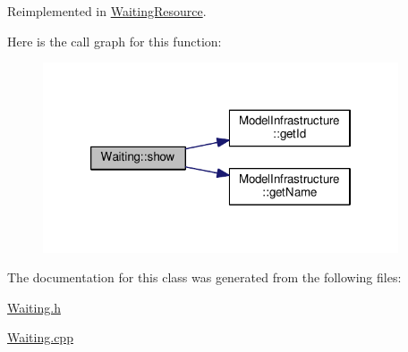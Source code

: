 Reimplemented in \hyperlink{class_waiting_resource_afb0323a90d99b50d66de7f38d069b122}{Waiting\-Resource}.



Here is the call graph for this function\-:
\nopagebreak
\begin{figure}[H]
\begin{center}
\leavevmode
\includegraphics[width=298pt]{class_waiting_aa8b8a3e589f580e3e066a0f9423f4c76_cgraph}
\end{center}
\end{figure}




The documentation for this class was generated from the following files\-:\begin{DoxyCompactItemize}
\item 
\hyperlink{_waiting_8h}{Waiting.\-h}\item 
\hyperlink{_waiting_8cpp}{Waiting.\-cpp}\end{DoxyCompactItemize}
